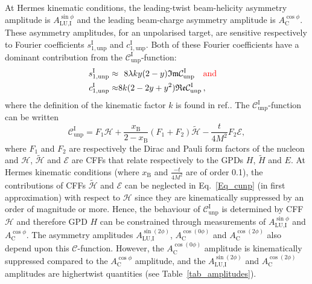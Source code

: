 At H{\sc ermes} kinematic conditions, the leading-twist beam-helicity asymmetry amplitude is $A_{\textrm{LU,I}}^{\sin\phi}$ and the leading beam-charge asymmetry amplitude is $A^{\cos\phi}_{\textrm{C}}$. These asymmetry amplitudes, for an unpolarised target, are sensitive respectively to Fourier coefficients $s_{1,\textrm{unp}}^{\textrm{I}}$ and $c_{1,\textrm{unp}}^{\textrm{I}}$. Both of these Fourier coefficients have a dominant contribution from the $\mathcal{C}_{\textrm{unp}}^{\textrm{I}}$-function:
\begin{eqnarray}
s_{1,\textrm{unp}}^{\textrm{I}} \approx&\,\,\,\,8\lambda ky(2-y)\mathfrak{Im}\mathcal{C}_{\textrm{unp}}^{\textrm{I}}\quad{\color{red}{\textrm{and}}\color{black}}&\label{eq:s1}
\\
 c_{1,\textrm{unp}}^{\textrm{I}} \approx&8k(2- 2y + y^{2})\mathfrak{Re}\mathcal{C}_{\textrm{unp}}^{\textrm{I}}\,,&\label{eq:c1}
\end{eqnarray}
where the definition of the kinematic factor $k$ is found
  in ref.\cite{Bel02b}. The $\mathcal{C}_{\textrm{unp}}^{\textrm{I}}$-function can be
written
\cite{Bel02b} 
\begin{equation}
 \mathcal{C}_{\textrm{unp}}^{\textrm{I}} = F_{1}\mathcal{H} + \frac{x_{\textrm{B}}}{2-x_{\textrm{B}}}(F_{1}+F_{2})\widetilde{\mathcal{H}} -\frac{t}{4M^{2}}F_{2}\mathcal{E},
\label{Eq_cunp}
\end{equation}
where $F_{1}$ and $F_{2}$ are respectively the Dirac and Pauli form
factors of the nucleon and $\mathcal{H}$, $\widetilde{\mathcal{H}}$ and
$\mathcal{E}$ are CFFs that relate respectively to the GPDs $H$,
$\widetilde{H}$ and $E$.  At H{\sc ermes} kinematic
conditions (where $x_{\textrm{B}}$ and $\frac{-t}{4M^2}$ are of order 0.1), the
contributions of CFFs $\widetilde{\mathcal{H}}$ and $\mathcal{E}$ can be
neglected in Eq.~\ref{Eq_cunp} (in first approximation) with respect to $\mathcal{H}$ since they
are kinematically suppressed by an order of magnitude or more.
Hence, the behaviour of
$\mathcal{C}_{\textrm{unp}}^{\textrm{I}}$ is determined by CFF $\mathcal{H}$
and therefore GPD $H$ can be constrained through
measurements of $A_{\textrm{LU,I}}^{\sin\phi}$ and $A^{\cos\phi}_{\textrm{C}}$.
The asymmetry amplitudes $A_{\textrm{LU},\textrm{I}}^{\sin(2\phi)}$,
$A^{\cos(0\phi)}_{\textrm{C}}$ and $A^{\cos(2\phi)}_{\textrm{C}}$ also depend
upon this $\mathcal{C}$-function. However, the $A^{\cos(0\phi)}_{\textrm{C}}$ amplitude is kinematically suppressed compared to the $A^{\cos\phi}_{\textrm{C}}$ amplitude, and the  $A_{\textrm{LU,I}}^{\sin(2\phi)}$ and $A^{\cos(2\phi)}_{\textrm{C}}$ amplitudes are higher\red{-}twist quantities (see Table~\ref{tab_amplitudes}).

